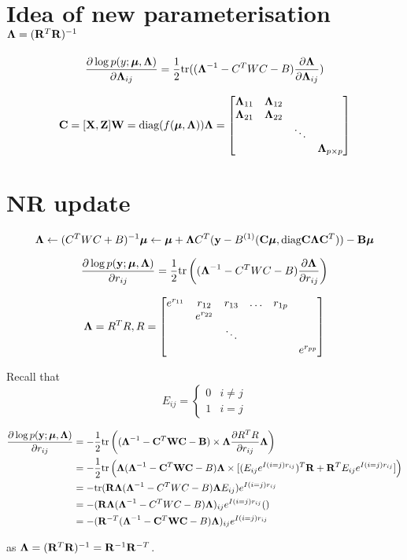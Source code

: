 \documentclass{article}[12pt]
\begin{document}
\section{Idea of new parameterisation ${\boldsymbol \Lambda} = ({\bf R}^T {\bf R})^{-1}$}
\begin{equation*}
\frac{\partial \log p(y;{\boldsymbol \mu}, {\boldsymbol \Lambda})}{\partial {\boldsymbol\Lambda}_{ij}} = {\frac{1}{2}} \text{tr} (({\boldsymbol \Lambda}^{-1} - C^T W C - B)\frac{\partial {\boldsymbol\Lambda}}{\partial {\boldsymbol\Lambda}_{ij}})
\end{equation*}

$$
{\bf C} = [{\bf X}, {\bf Z}]
{\bf W} = \text{diag}(f({\boldsymbol \mu}, {\boldsymbol \Lambda}))
{\boldsymbol \Lambda} = \begin{bmatrix}
{\boldsymbol\Lambda}_{11} & {\boldsymbol \Lambda}_{12} &  &\\
{\boldsymbol \Lambda}_{21} & {\boldsymbol \Lambda}_{22} &  &\\
& & \ddots & \\
& & & {\boldsymbol \Lambda}_{p \times p}
\end{bmatrix}
$$

\section{NR update}
$$
{\boldsymbol \Lambda} \leftarrow (C^T W C + B)^{-1}
{\boldsymbol \mu} \leftarrow {\boldsymbol\mu} + {\boldsymbol \Lambda} C^T ({\bf y} - B^{(1)}({\bf C}{\boldsymbol \mu}, \text{diag} {\bf C} {\boldsymbol\Lambda} {\bf C}^T)) - {\bf B} {\boldsymbol \mu}
$$

$$
\frac{\partial \log p ({\bf y};{\boldsymbol \mu}, {\boldsymbol \Lambda})}{\partial r_{ij}} = {\frac{1}{2}} \text{tr} \left (({\boldsymbol \Lambda}^{-1} - C^T W C - B) \frac{\partial {\boldsymbol\Lambda}}{\partial r_{ij}} \right )
$$

$$
{\boldsymbol \Lambda} = R^T R, 
R = \begin{bmatrix}
e^{r_{11}} & r_{12} & r_{13} & \dots & r_{1p} \\
& e^{r_{22}} & & & & \\
&  & \ddots & & & \\
&  & & & & e^{r_{pp}}\\
\end{bmatrix}
$$

Recall that
$$E_{ij} =
\begin{cases}
0 & i \ne j \\
1 & i = j
\end{cases}
$$

\begin{align*}
\frac{\partial \log p({\bf y}; {\boldsymbol \mu}, {\boldsymbol \Lambda})}{\partial r_{ij}} &= - {\frac{1}{2}} \text{tr} \left( ({\boldsymbol \Lambda}^{-1} - {\bf C}^T {\bf W} {\bf C} - {\bf B}) \times {\boldsymbol\Lambda} \frac{\partial R^T R}{\partial r_{ij}} {\boldsymbol \Lambda} \right) \\
&= - {\frac{1}{2}} \text{tr} \left( {\boldsymbol \Lambda}({\boldsymbol \Lambda}^{-1} - {\bf C}^T{\bf W}{\bf C} - B){\boldsymbol \Lambda} \times [(E_{ij} e^{I(i=j)r_{ij}})^T {\bf R} + {\bf R}^T E_{ij} e^{I(i=j) r_{ij}}] \right) \\
&= - \text{tr} ({\bf R} {\boldsymbol \Lambda} ({\boldsymbol \Lambda}^{-1} - C^T W C - B) {\boldsymbol \Lambda} E_{ij})e^{I(i=j) r_{ij}} \\
&= - ({\bf R} {\boldsymbol \Lambda} ({\boldsymbol \Lambda}^{-1} - C^T W C - B) {\boldsymbol \Lambda})_{ij} e^{I(i=j) r_{ij}} () \\
&= - ({\bf R}^{-T} ({\boldsymbol \Lambda}^{-1} - {\bf C}^T {\bf W} {\bf C} - B) {\boldsymbol \Lambda})_{ij} e^{I(i=j) r_{ij}}
\end{align*}

as ${\boldsymbol \Lambda} = ({\bf R}^T {\bf R})^{-1} = {\bf R}^{-1} {\bf R}^{-T}$.
\end{document}
